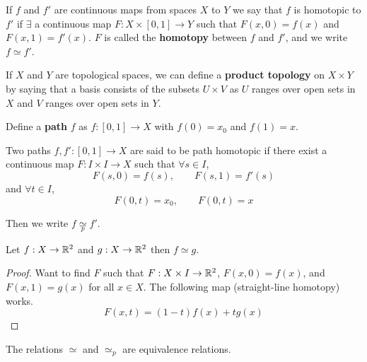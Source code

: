\documentclass[12pt]{amsart}
\begin{document}
\begin{definition}
    If $f$ and $f'$ are continuous maps from spaces $X$ to $Y$ we say that $f$ is homotopic to $f'$ if $\exists$ a continuous map $F: X \times [0,1]  \to Y$ such that $F(x, 0) = f(x)$ and $F(x, 1) = f'(x)$.  $F$ is called the \textbf{homotopy} between $f$ and $f'$, and we write $f \simeq f'$.
\end{definition}

\begin{definition}
    If $X$ and $Y$ are topological spaces, we can define a \textbf{product topology} on $X \times Y$ by saying that a basis consists of the subsets $U \times V$ as $U$ ranges over open sets in $X$ and $V$ ranges over open sets in $Y$.
\end{definition}

\begin{definition}
    Define a \textbf{path} $f$ as $f: [0,1] \to X$ with $f(0) = x_0$ and $f(1) = x$. 
\end{definition}

\begin{definition}
    Two paths $f, f': [0,1] \to X$ are said to be path homotopic if there exist a continuous map $F: I \times I \to X$ such that $\forall s \in I$, 
    \[ F(s, 0) = f(s), \qquad F(s, 1) = f'(s)\]
    and $\forall t \in I$, 
    \[ F(0, t) = x_0, \qquad F(0, t) = x\]

    Then we write $f \underset p \simeq f'$. 
\end{definition}


\begin{example}
    Let $f: X \to \mathbb R^2$ and $g: X \to \mathbb R^2$ then $f \simeq g$. 
\end{example}

\begin{proof}
     Want to find $F$ such that $F: X \times I \to \mathbb R^2$, $F(x, 0) = f(x)$, and $F(x,1) = g(x)$ for all $x \in X$. The following map (straight-line homotopy) works. 
    \[F(x,t) = (1-t)f(x) + tg(x)\]
\end{proof}

\begin{lemma}
     The relations $\simeq$ and $\simeq_p$ are equivalence relations. 
\end{lemma}
\end{document}
